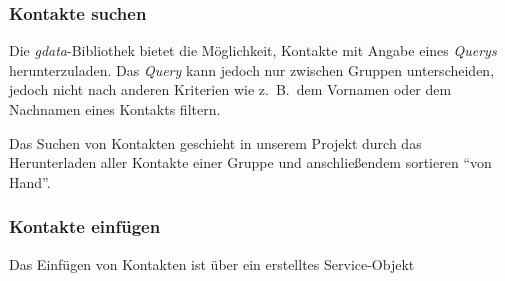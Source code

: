 \subsubsection{Kontakte suchen}
Die \emph{gdata}-Bibliothek bietet die Möglichkeit, Kontakte mit Angabe eines \emph{Querys}
 herunterzuladen.
Das \emph{Query} kann jedoch nur zwischen Gruppen unterscheiden, jedoch nicht nach anderen
 Kriterien wie z.\ B.\ dem Vornamen oder dem Nachnamen eines Kontakts filtern.

Das Suchen von Kontakten geschieht in unserem Projekt durch das Herunterladen aller Kontakte
 einer Gruppe und anschließendem sortieren "`von Hand"'.

\subsubsection{Kontakte einf\"ugen}
Das Einfügen von Kontakten ist über ein erstelltes Service-Objekt 
